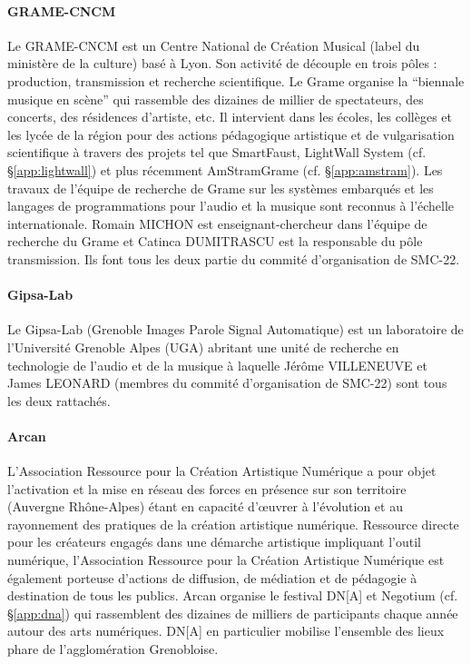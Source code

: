 \documentclass[fontsize=12pt]{scrartcl} %
\numberwithin{equation}{section} %
\numberwithin{figure}{section} %
\numberwithin{table}{section} %
\begin{document}
\paragraph{\textbf{GRAME-CNCM}} Le GRAME-CNCM est un Centre National de Création Musical (label du ministère de la culture) basé à Lyon. Son activité de découple en trois pôles : production, transmission et recherche scientifique. Le Grame organise la ``biennale musique en scène'' qui rassemble des dizaines de millier de spectateurs, des concerts, des résidences d'artiste, etc. Il intervient dans les écoles, les collèges et les lycée de la région pour des actions pédagogique artistique et de vulgarisation scientifique à travers des projets tel que SmartFaust, LightWall System (cf. \S\ref{app:lightwall}) et plus récemment AmStramGrame (cf. \S\ref{app:amstram}). Les travaux de l'équipe de recherche de Grame sur les systèmes embarqués et les langages de programmations pour l'audio et la musique sont reconnus à l'échelle internationale. Romain MICHON est enseignant-chercheur dans l'équipe de recherche du Grame et Catinca DUMITRASCU est la responsable du pôle transmission. Ils font tous les deux partie du commité d'organisation de SMC-22.

\paragraph{\textbf{Gipsa-Lab}} Le Gipsa-Lab (Grenoble Images Parole Signal Automatique) est un laboratoire de l'Université Grenoble Alpes (UGA) abritant une unité de recherche en technologie de l'audio et de la musique à laquelle Jérôme VILLENEUVE et James LEONARD (membres du commité d'organisation de SMC-22) sont tous les deux rattachés.

\paragraph{\textbf{Arcan}} L’Association Ressource pour la Création Artistique Numérique a pour objet l’activation et la mise en réseau des forces en présence sur son territoire (Auvergne Rhône-Alpes) étant en capacité d’œuvrer à l’évolution et au rayonnement des pratiques de la création artistique numérique. Ressource directe pour les créateurs engagés dans une démarche artistique impliquant l’outil numérique, l’Association Ressource pour la Création Artistique Numérique est également porteuse d’actions de diffusion, de médiation et de pédagogie à destination de tous les publics. Arcan organise le festival DN[A] et Negotium (cf. \S\ref{app:dna}) qui rassemblent des dizaines de milliers de participants chaque année autour des arts numériques. DN[A] en particulier mobilise l'ensemble des lieux phare de l’agglomération Grenobloise.
\end{document}
